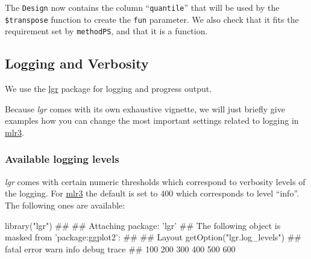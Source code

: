 \documentclass[]{article}
\newenvironment{Shaded}{}{}
\newcommand{\DecValTok}[1]{#1}
\newcommand{\KeywordTok}[1]{\textcolor[rgb]{0.00,0.00,1.00}{#1}}
\newcommand{\NormalTok}[1]{#1}
\newcommand{\OperatorTok}[1]{#1}
\newcommand{\StringTok}[1]{\textcolor[rgb]{0.00,0.50,0.50}{#1}}
\renewenvironment{Shaded} {\begin{snugshade}\small} {\end{snugshade}}
\begin{document}
The \texttt{Design} now contains the column ``\texttt{quantile}'' that will be used by the \texttt{\$transpose} function to create the \texttt{fun} parameter.
We also check that it fits the requirement set by \texttt{methodPS}, and that it is a function.

\begin{Shaded}
\end{Shaded}

\hypertarget{logging}{%
\subsection{Logging and Verbosity}\label{logging}}

We use the \href{https://cran.r-project.org/package=lgr}{lgr} package for logging and progress output.

Because \emph{lgr} comes with its own exhaustive vignette, we will just briefly give examples how you can change the most important settings related to logging in \href{https://mlr3.mlr-org.com}{mlr3}.

\hypertarget{available-logging-levels}{%
\subsubsection{Available logging levels}\label{available-logging-levels}}

\emph{lgr} comes with certain numeric thresholds which correspond to verbosity levels of the logging.
For \href{https://mlr3.mlr-org.com}{mlr3} the default is set to 400 which corresponds to level ``info''.
The following ones are available:

\begin{Shaded}
\begin{Highlighting}[]
\KeywordTok{library}\NormalTok{(}\StringTok{"lgr"}\NormalTok{)}
\NormalTok{## }
\NormalTok{## Attaching package: 'lgr'}
\NormalTok{## The following object is masked from 'package:ggplot2':}
\NormalTok{## }
\NormalTok{##     Layout}
\KeywordTok{getOption}\NormalTok{(}\StringTok{"lgr.log_levels"}\NormalTok{)}
\NormalTok{## fatal error  warn  info debug trace }
\NormalTok{##   100   200   300   400   500   600}
\end{Highlighting}
\end{Shaded}
\end{document}
